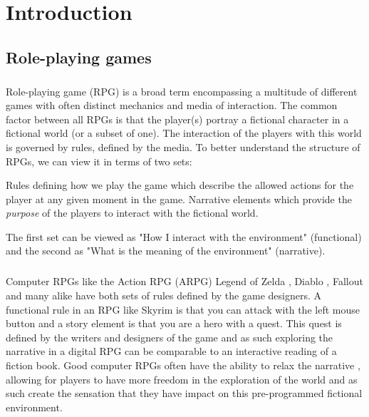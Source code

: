\documentclass{UoYCSproject}
\begin{document}
\chapter{Introduction}
\label{cha:Introduction}

\section{Role-playing games}

\paragraph{}
Role-playing game (RPG) is a broad term encompassing a multitude of different games with often distinct mechanics and media of interaction. The common factor between all RPGs is that the player(s) portray a fictional character in a fictional world (or a subset of one). The interaction of the players with this world is governed by rules, defined by the media. To better understand the structure of RPGs, we can view it in terms of two sets: 
\begin{outline}[enumerate]
  \1 Rules defining how we play the game which describe the allowed actions for the player at any given moment in the game.
  \1 Narrative elements which provide the \textit{purpose} of the players to interact with the fictional world. 
\end{outline}
The first set can be viewed as "How I interact with the environment" (functional) and the second as "What is the meaning of the environment" (narrative).

\paragraph{}
Computer RPGs like the Action RPG (ARPG) Legend of Zelda \parencite{game:LoZ}, Diablo \parencite{game:Diablo}, Fallout \parencite{game:Fallout} and many alike have both sets of rules defined by the game designers. A functional rule in an RPG like Skyrim \parencite{game:Skyrim} is that you can attack with the left mouse button and a story element is that you are a hero with a quest. This quest is defined by the writers and designers of the game and as such exploring the narrative in a digital RPG can be comparable to an interactive reading of a fiction book. Good computer RPGs often have the ability to relax the narrative \parencite{TychsenGM}, allowing for players to have more freedom in the exploration of the world and as such create the sensation that they have impact on this pre-programmed fictional environment.
\end{document}
